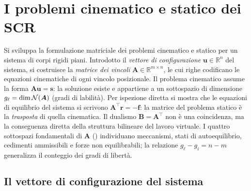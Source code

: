 \graphicspath{{Parti/P03-Meccanica_SR/C05-Problemi_CinStat_SCR/Figure/}}
\chapter{I problemi cinematico e statico dei SCR}\label{cap:problemi_cin_stat_SCR}

\begin{sommario}
	Si sviluppa la formulazione matriciale dei problemi cinematico	e statico per un sistema di corpi rigidi piani. Introdotto il
	\emph{vettore di configurazione} $\bm{u} \in \mathbb{R}^{n}$	del sistema, si costruisce la \emph{matrice dei vincoli}
	$\bm{A} \in \mathbb{R}^{m \times n}$, le cui righe codificano	le equazioni cinematiche di ogni vincolo posizionale. Il
	problema cinematico assume la forma $\bm{A}\bm{u} = \bm{s}$: la soluzione esiste e appartiene a un sottospazio di dimensione
	$g_\ell = \dim\mathcal{N}(\bm{A})$ (gradi di labilità). Per ispezione diretta si mostra che le equazioni di	equilibrio del sistema si scrivono	$\bm{A}^{\top}\bm{r} = -\bm{f}$: la matrice del	problema statico è la \emph{trasposta} di quella cinematica.
	Il dualismo	$\bm{B} = \bm{A}^{\top}$ non è una coincidenza, ma la	conseguenza diretta della struttura bilineare del lavoro virtuale. I quattro sottospazi fondamentali di $\bm{A}$ () individuano meccanismi, stati di	autoequilibrio, cedimenti ammissibili e forze non	equilibrabili; la relazione $g_\ell - g_i = n - m$	generalizza il conteggio dei gradi di libertà. 
\end{sommario}


\section{Il vettore di configurazione del sistema}\label{sec:conf}

